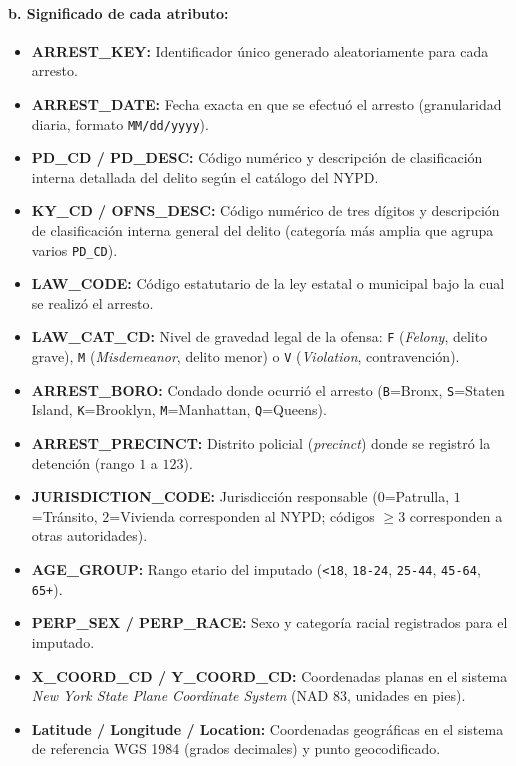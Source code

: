 \paragraph{b. Significado de cada atributo:}
\begin{itemize}
    \item \textbf{ARREST\_KEY:} Identificador único generado aleatoriamente para cada arresto.
    \item \textbf{ARREST\_DATE:} Fecha exacta en que se efectuó el arresto (granularidad diaria, formato \texttt{MM/dd/yyyy}).
    \item \textbf{PD\_CD / PD\_DESC:} Código numérico y descripción de clasificación interna detallada del delito según el catálogo del NYPD.
    \item \textbf{KY\_CD / OFNS\_DESC:} Código numérico de tres dígitos y descripción de clasificación interna general del delito (categoría más amplia que agrupa varios \texttt{PD\_CD}).
    \item \textbf{LAW\_CODE:} Código estatutario de la ley estatal o municipal bajo la cual se realizó el arresto.
    \item \textbf{LAW\_CAT\_CD:} Nivel de gravedad legal de la ofensa: \texttt{F} (\textit{Felony}, delito grave), \texttt{M} (\textit{Misdemeanor}, delito menor) o \texttt{V} (\textit{Violation}, contravención).
    \item \textbf{ARREST\_BORO:} Condado donde ocurrió el arresto (\texttt{B}=Bronx, \texttt{S}=Staten Island, \texttt{K}=Brooklyn, \texttt{M}=Manhattan, \texttt{Q}=Queens).
    \item \textbf{ARREST\_PRECINCT:} Distrito policial (\textit{precinct}) donde se registró la detención (rango $1$ a $123$).
    \item \textbf{JURISDICTION\_CODE:} Jurisdicción responsable ($0$=Patrulla, $1$=Tránsito, $2$=Vivienda corresponden al NYPD; códigos $\ge 3$ corresponden a otras autoridades).
    \item \textbf{AGE\_GROUP:} Rango etario del imputado (\texttt{<18}, \texttt{18-24}, \texttt{25-44}, \texttt{45-64}, \texttt{65+}).
    \item \textbf{PERP\_SEX / PERP\_RACE:} Sexo y categoría racial registrados para el imputado.
    \item \textbf{X\_COORD\_CD / Y\_COORD\_CD:} Coordenadas planas en el sistema \textit{New York State Plane Coordinate System} (NAD 83, unidades en pies).
    \item \textbf{Latitude / Longitude / Location:} Coordenadas geográficas en el sistema de referencia WGS 1984 (grados decimales) y punto geocodificado.
\end{itemize}

